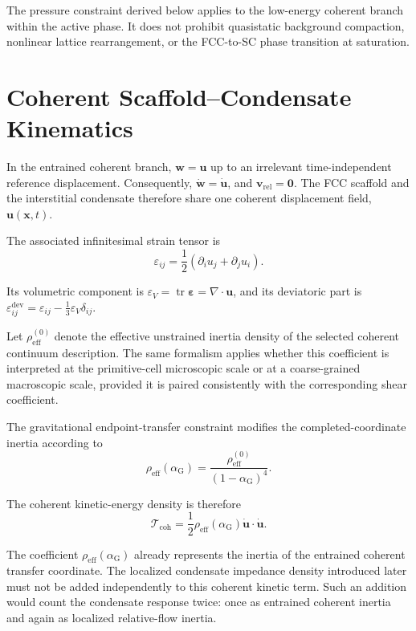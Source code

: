 The pressure constraint derived below applies to the low-energy coherent branch within the active phase. It does not prohibit quasistatic background compaction, nonlinear lattice rearrangement, or the FCC-to-SC phase transition at saturation.

\section{Coherent Scaffold--Condensate Kinematics}

In the entrained coherent branch, $\mathbf{w}=\mathbf{u}$ up to an irrelevant time-independent reference displacement. Consequently, $\dot{\mathbf{w}}=\dot{\mathbf{u}}$, and $\mathbf{v}_{\mathrm{rel}}=\mathbf{0}$. The FCC scaffold and the interstitial condensate therefore share one coherent displacement field, $\mathbf{u}(\mathbf{x},t)$.

The associated infinitesimal strain tensor is
\begin{equation}
    \varepsilon_{ij} = \frac{1}{2} \left( \partial_i u_j + \partial_j u_i \right).
\end{equation}

Its volumetric component is $\varepsilon_V = \operatorname{tr}\boldsymbol{\varepsilon} = \nabla\cdot\mathbf{u}$, and its deviatoric part is $\varepsilon_{ij}^{\mathrm{dev}} = \varepsilon_{ij} - \frac{1}{3}\varepsilon_V\delta_{ij}$.

Let $\rho_{\mathrm{eff}}^{(0)}$ denote the effective unstrained inertia density of the selected coherent continuum description. The same formalism applies whether this coefficient is interpreted at the primitive-cell microscopic scale or at a coarse-grained macroscopic scale, provided it is paired consistently with the corresponding shear coefficient.

The gravitational endpoint-transfer constraint modifies the completed-coordinate inertia according to
\begin{equation}
    \rho_{\mathrm{eff}}(\alpha_{\mathrm{G}}) = \frac{\rho_{\mathrm{eff}}^{(0)}}{(1-\alpha_{\mathrm{G}})^4}.
\end{equation}

The coherent kinetic-energy density is therefore
\begin{equation}
    \mathcal{T}_{\mathrm{coh}} = \frac{1}{2} \rho_{\mathrm{eff}}(\alpha_{\mathrm{G}}) \dot{\mathbf{u}}\cdot\dot{\mathbf{u}}.
\end{equation}

The coefficient $\rho_{\mathrm{eff}}(\alpha_{\mathrm{G}})$ already represents the inertia of the entrained coherent transfer coordinate. The localized condensate impedance density introduced later must not be added independently to this coherent kinetic term. Such an addition would count the condensate response twice: once as entrained coherent inertia and again as localized relative-flow inertia.

